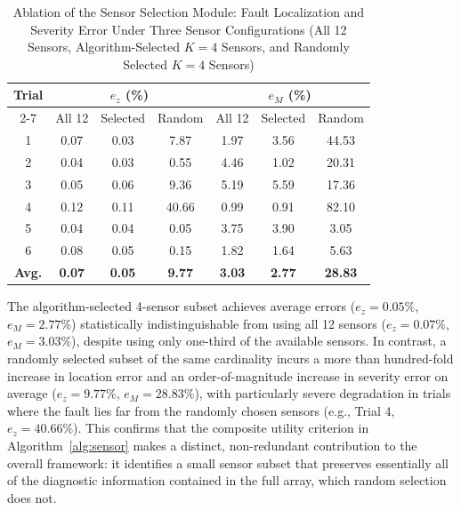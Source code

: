 \begin{table}[ht]
\centering
\caption{\label{tab:ablation_sensor}%
Ablation of the Sensor Selection Module: Fault Localization and
Severity Error Under Three Sensor Configurations (All 12 Sensors,
Algorithm-Selected $K=4$ Sensors, and Randomly Selected $K=4$ Sensors)}
\begin{tabular}{|c|c|c|c|c|c|c|}
\hline
\multirow{2}{*}{Trial} & \multicolumn{3}{c|}{$e_z$ (\%)} & \multicolumn{3}{c|}{$e_M$ (\%)} \\
\cline{2-7}
& All 12 & Selected & Random & All 12 & Selected & Random \\
\hline
1 & 0.07 & 0.03 & 7.87  & 1.97 & 3.56 & 44.53 \\
2 & 0.04 & 0.03 & 0.55  & 4.46 & 1.02 & 20.31 \\
3 & 0.05 & 0.06 & 9.36  & 5.19 & 5.59 & 17.36 \\
4 & 0.12 & 0.11 & 40.66 & 0.99 & 0.91 & 82.10 \\
5 & 0.04 & 0.04 & 0.05  & 3.75 & 3.90 & 3.05  \\
6 & 0.08 & 0.05 & 0.15  & 1.82 & 1.64 & 5.63  \\
\hline
\textbf{Avg.} & \textbf{0.07} & \textbf{0.05} & \textbf{9.77} & \textbf{3.03} & \textbf{2.77} & \textbf{28.83} \\
\hline
\end{tabular}
\end{table}

The algorithm-selected 4-sensor subset achieves average errors
($e_z = 0.05\%$, $e_M = 2.77\%$) statistically indistinguishable from
using all 12 sensors ($e_z = 0.07\%$, $e_M = 3.03\%$), despite using
only one-third of the available sensors. In contrast, a randomly
selected subset of the same cardinality incurs a more than
hundred-fold increase in location error and an order-of-magnitude
increase in severity error on average ($e_z = 9.77\%$, $e_M = 28.83\%$),
with particularly severe degradation in trials where the fault lies
far from the randomly chosen sensors (e.g., Trial 4, $e_z = 40.66\%$).
This confirms that the composite utility criterion in
Algorithm~\ref{alg:sensor} makes a distinct, non-redundant contribution
to the overall framework: it identifies a small sensor subset that
preserves essentially all of the diagnostic information contained in
the full array, which random selection does not.

